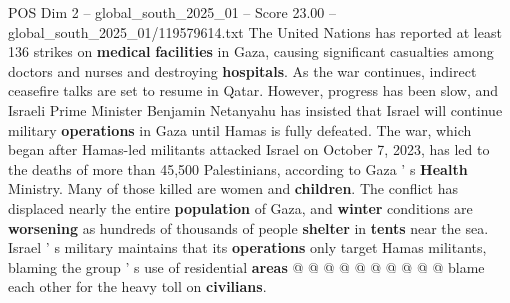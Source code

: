 \begin{textsample}{POS Dim 2 – global\_south\_2025\_01 – Score 23.00 – global\_south\_2025\_01/119579614.txt}
The United Nations has reported at least 136 strikes on \textbf{medical} \textbf{facilities} in Gaza, causing significant casualties among doctors and nurses and destroying \textbf{hospitals}.
As the war continues, indirect ceasefire talks are set to resume in Qatar.
However, progress has been slow, and Israeli Prime Minister Benjamin Netanyahu has insisted that Israel will continue military \textbf{operations} in Gaza until Hamas is fully defeated.
The war, which began after Hamas-led militants attacked Israel on October 7, 2023, has led to the deaths of more than 45,500 Palestinians, according to Gaza ' s \textbf{Health} Ministry.
Many of those killed are women and \textbf{children}.
The conflict has displaced nearly the entire \textbf{population} of Gaza, and \textbf{winter} conditions are \textbf{worsening} as hundreds of thousands of people \textbf{shelter} in \textbf{tents} near the sea.
Israel ' s military maintains that its \textbf{operations} only target Hamas militants, blaming the group ' s use of residential \textbf{areas} @ @ @ @ @ @ @ @ @ @ blame each other for the heavy toll on \textbf{civilians}.

\end{textsample}
